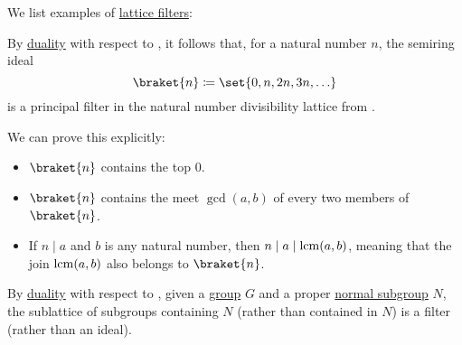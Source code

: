 \begin{example}\label{ex:lattice_filters}
  We list examples of \hyperref[thm:lattice_ideals]{lattice filters}:
  \begin{thmenum}
     By \hyperref[def:partially_ordered_set/duality]{duality} with respect to , it follows that, for a natural number \( n \), the semiring ideal
    \begin{equation*}
      \braket{ n } \coloneqq \set{ 0, n, 2n, 3n, \ldots }
    \end{equation*}
    is a principal filter in the natural number divisibility lattice from .

    We can prove this explicitly:
    \begin{itemize}
      \item \( \braket{ n } \) contains the top \( 0 \).
      \item \( \braket{ n } \) contains the meet \( \gcd(a, b) \) of every two members of \( \braket{ n } \).
      \item If \( n \mid a \) and \( b \) is any natural number, then \( n \mid a \mid \operatorname{lcm}(a, b) \), meaning that the join \( \operatorname{lcm}(a, b) \) also belongs to \( \braket{ n } \).
    \end{itemize}

     By \hyperref[def:partially_ordered_set/duality]{duality} with respect to , given a \hyperref[def:group]{group} \( G \) and a proper \hyperref[thm:normal_subgroup_equivalences]{normal subgroup} \( N \), the sublattice of subgroups containing \( N \) (rather than contained in \( N \)) is a filter (rather than an ideal).
  \end{thmenum}
\end{example}
